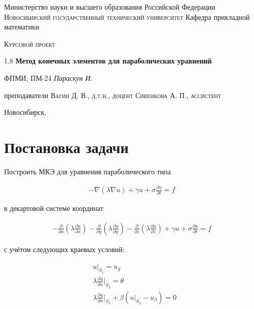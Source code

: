 \documentclass[12pt]{article}
\begin{document}
\begin{titlepage}
\centering

{Министерство науки и высшего образования Российской Федерации}
\vskip 2mm
{\large\scshape Новосибирский государственный технический университет}
\vskip 2mm
{Кафедра прикладной математики}

\vfill
\vskip 3cm

{\scshape Курсовой проект}
\vskip 3mm
\begin{spacing}{1.8}
    {\huge\bf Метод конечных элементов для параболических уравнений}
\end{spacing}
\vskip 5mm
{\scriptsize ФПМИ, ПМ-24}
\vskip 2mm
{\large\it Параскун И.}

\vfill

{преподаватели}
\vskip 2mm
{\scshape Вагин Д. В., д.т.н., доцент}
\vskip 1mm
{\scshape Сивенкова А. П., ассистент}

\vfill

{Новосибирск, \the\year}

\end{titlepage}

\setcounter{page}{2}
\tableofcontents
\newpage

\section{Постановка задачи}

\noindent Построить МКЭ для уравнения параболического типа

\begin{align}
  \label{eq:1} -\nabla(\lambda \nabla u) + \gamma u + 
    \sigma\frac{\partial u}{\partial t} = f
\end{align}

\vspace{4mm}
\noindent в декартовой системе координат

\begin{align}
  - \frac{\partial}{\partial x}(\lambda\frac{\partial u}{\partial x}) 
  - \frac{\partial}{\partial y}(\lambda\frac{\partial u}{\partial y}) 
  - \frac{\partial}{\partial z}(\lambda\frac{\partial u}{\partial z})
    + \gamma u + \sigma\frac{\partial u}{\partial t} = f
\end{align}

\vskip 4mm
\noindent с учётом следующих краевых условий:

\begin{align}
  &u \big|_{S_1} = u_g \\
  &\lambda\frac{\partial u}{\partial n} \bigg|_{S_2} = \theta \\
  &\lambda\frac{\partial u}{\partial n} \bigg|_{S_3} +
    \beta(u \big|_{S_3} - u_{\beta}) = 0
\end{align}
\end{document}
